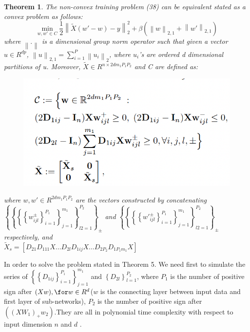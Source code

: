 \documentclass{article}
\newtheorem{theorem}{Theorem}
\begin{document}
\begin{theorem}
    The non-convex training problem (38) can be equivalent stated as a convex problem as follows:\\
    \begin{equation}
            \min_{w,w' \in C}\frac{1}{2}\left \| \widetilde{X}(w'-w)-y \right \|_2^2+\beta(\left \| w \right \|_{2,1}+\left \| w' \right \|_{2,1})
    \end{equation}
    where $\left \| . \right \|$ is a dimensional group norm operator such that given a vector $u\in R^{dp}$, $\left \|  u\right \|_{2,1}=\sum_{i=1}^{P}\left \| u_i \right \|_2$, where $u_i$'s are ordered d dimensional partitions of u. Moreover, $\widetilde{X} \in R^{n\times 2dm_1P_1P_2}$ and C are defined as:
    \begin{figure}[H]
        \centering
        \includegraphics[scale=0.7]{Fig3}
    \end{figure}
    where $w,w'\in R^{2dm_1P_1P_2}$ are the vectors constructed by concatenating $\left \{ \left \{ \left \{ \left \{ w_{ijl}^{\pm} \right \}_{i=1}^{P_1} \right \}_{j=1}^{m_1} \right \}_{l2=1}^{P_2} \right \}_{\pm}$ and $\left \{ \left \{ \left \{ \left \{ w'_{ijl}^{\pm} \right \}_{i=1}^{P_1} \right \}_{j=1}^{m_1} \right \}_{l2=1}^{P_2} \right \}_{\pm}$ respectively, and\\
    $\widetilde{X}_s=\left [ D_{21}D_{111}X...D_{2l}D_{1ij}X...D_{2P_2}D_{1P_1m_1}X \right ]$
\end{theorem}
In order to solve the problem stated in Theorem 5. We need first to simulate the series of $\left \{\left \{ D_{1ij} \right \}_{i=1}^{P_1} \right \}_{j=1}^{m_1}$ and $\left\{D_{2l}\right\}_{l=1}^{P_2}$, where $P_1$ is the number of positive sign after $(Xw),\for w\in R^d$($w$ is the connecting layer between input data and first layer of sub-networks), $P_2$ is the number of positive sign after $((X W_1)_+w_2)$.They are all in polynomial time complexity with respect to input dimension $n$ and $d$ \cite{deeprelu}. \\
\end{document}
